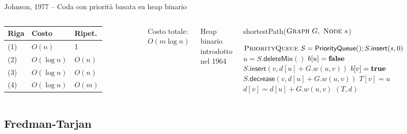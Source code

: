 \begin{frame}{Johnson, 1977 -- Coda con priorità basata su heap binario}


\vspace{-9pt}

\begin{columns}

\begingroup
\renewcommand*{\arraystretch}{1.2}
\begin{tabular}{|l|l|l|}
\hline
Riga & Costo & Ripet. \\\hline
(1) & $O(n)$ & 1 \\\hline
(2) & $O(\log n)$ & $O(n)$ \\\hline
(3) & $O(\log n)$ & $O(n)$ \\\hline
(4) & $O(\log n)$ & $O(m)$ \\\hline
\end{tabular}
\endgroup

\medskip
Costo totale: \alert{$O(m \log n)$}

\medskip
Heap binario introdotto nel 1964

\vspace{-12pt}
\tiny
\begin{Procedure}
\caption[A]{\textsf{shortestPath}($\textsc{Graph}\ G,\ \textsc{Node}\ s$)}
\alert{$\textsc{PriorityQueue}\ S = \textsf{PriorityQueue}(); S.\textsf{insert}(s, 0)$}\;
{
  \alert{$u = S.\textsf{deleteMin}()$}\;
  $b[u] = \FALSE$\;
  {
    {
      {
        \alert{$S.\textsf{insert}(v, d[u]+G.w(u,v))$}\;
        $b[v] = \TRUE$\;
      }
      {
        \alert{$S.\textsf{decrease}(v, d[u]+G.w(u,v))$}
      }
      $T[v] = u$\;
      $d[v] = d[u] + G.w(u,v)$\;
    }
  }
}
\Return $(T,d)$
\end{Procedure}
\end{columns}



\end{frame}

\subsection{Fredman-Tarjan}



